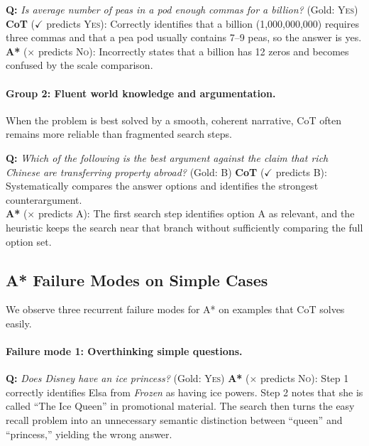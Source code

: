 \documentclass[11pt]{article}
\begin{document}
{\begin{examplebox}[title=StrategyQA --- Direct Factual Reasoning]
\textbf{Q:} \emph{Is average number of peas in a pod enough commas for a billion?} \quad (Gold: \textsc{Yes})
\tcblower
\textbf{CoT} ($\checkmark$ predicts \textsc{Yes}): Correctly identifies that a billion (1,000,000,000) requires three commas and that a pea pod usually contains 7--9 peas, so the answer is yes.\\[4pt]
\textbf{A*} ($\times$ predicts \textsc{No}): Incorrectly states that a billion has 12 zeros and becomes confused by the scale comparison.
\end{examplebox}

\paragraph{Group 2: Fluent world knowledge and argumentation.}
When the problem is best solved by a smooth, coherent narrative, CoT often remains more reliable than fragmented search steps.

\begin{examplebox}[title=LogicQA --- Fluent Argumentation]
\textbf{Q:} \emph{Which of the following is the best argument against the claim that rich Chinese are transferring property abroad?} \quad (Gold: B)
\tcblower
\textbf{CoT} ($\checkmark$ predicts B): Systematically compares the answer options and identifies the strongest counterargument.\\[4pt]
\textbf{A*} ($\times$ predicts A): The first search step identifies option A as relevant, and the heuristic keeps the search near that branch without sufficiently comparing the full option set.
\end{examplebox}

\subsection{A* Failure Modes on Simple Cases}
\label{app:astar_failures}

We observe three recurrent failure modes for A* on examples that CoT solves easily.

\paragraph{Failure mode 1: Overthinking simple questions.}

\begin{examplebox}[title=StrategyQA --- Overthinking]
\textbf{Q:} \emph{Does Disney have an ice princess?} \quad (Gold: \textsc{Yes})
\tcblower
\textbf{A*} ($\times$ predicts \textsc{No}): Step 1 correctly identifies Elsa from \emph{Frozen} as having ice powers. Step 2 notes that she is called ``The Ice Queen'' in promotional material. The search then turns the easy recall problem into an unnecessary semantic distinction between ``queen'' and ``princess,'' yielding the wrong answer.
\end{examplebox}

}
\end{document}
